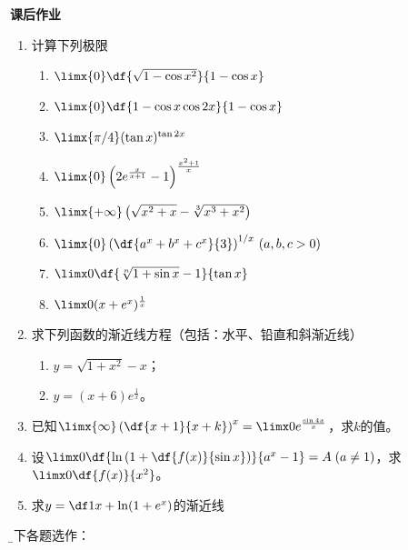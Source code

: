 \begin{ext}
	{\centering\bf 课后作业}
	
	\begin{enumerate}  
	  \item 计算下列极限
	  \begin{enumerate}[(1)]
		\item $\limx{0}\df{\sqrt{1-\cos x^2}}{1-\cos x}$ 
		\item $\limx{0}\df{1-\cos x\cos 2x}{1-\cos x}$
		\item $\limx{\pi /4}(\tan x)^{\tan 2x}$ 
		\item $\limx{0}\left(2e^{\frac{x}{x+1}}-1\right)^{\frac{x^2+1}{x}}$ 
		\item $\limx{+\infty}\left(\sqrt{x^2+x}-\sqrt[3]{x^3+x^2}\right)$ 
		\item $\limx{0}\left(\df{a^x+b^x+c^x}{3}\right)^{1/x}\,(a,b,c>0)$  
		\item $\limx0\df{\sqrt[n]{1+\sin x}-1}{\tan x}$
		\item $\limx0(x+e^x)^{\frac1x}$
	  \end{enumerate}
	  \item 求下列函数的渐近线方程（包括：水平、铅直和斜渐近线）
	  \begin{enumerate}[(1)]
	    \item $y=\sqrt{1+x^2}-x$；
	    \item $y=(x+6)e^{\frac1x}$。
	  \end{enumerate}
	  \item 已知$\limx{\infty}\left(\df{x+1}{x+k}\right)^x
	  =\limx0e^{\frac{\sin 4x}x}$，求$k$的值。
	  \item 设$\limx0\df{\ln\left(1+\df{f(x)}{\sin x}\right)}{a^x-1}=A\;(a\ne 1)$，求
		$\limx0\df{f(x)}{x^2}$。
		\item 求$y=\df1x+\ln(1+e^x)$的渐近线
	\end{enumerate}
	\tcblower
	{\kaishu\b 以下各题选作：}
	

\end{ext}
